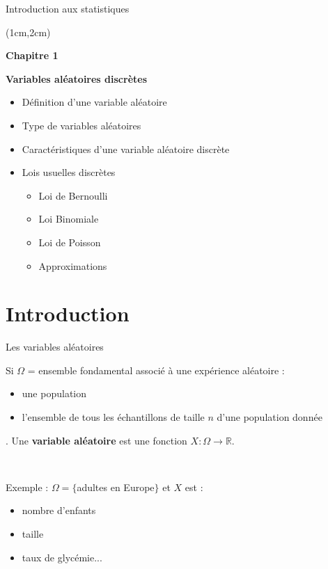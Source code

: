 \documentclass{beamer}
\begin{document}



\begin{frame}{Introduction aux statistiques}
\begin{textblock*}{\textwidth}(1cm,2cm)

\begin{center}{\bf \Large Chapitre 1} \end{center}
\begin{center}{\bf \Large Variables aléatoires discrètes} \end{center}
\vspace{0.3cm}
\begin{itemize}
\item Définition d'une variable aléatoire 
\item Type de variables aléatoires
\item Caractéristiques d'une variable aléatoire discrète
\item Lois usuelles discrètes 
\begin{itemize}
\item Loi de Bernoulli
\item Loi Binomiale
\item Loi de Poisson
\item Approximations
\end{itemize}
\end{itemize}

 \end{textblock*}

\end{frame}

\section{Introduction}
\begin{frame}{Les variables aléatoires}

Si $\Omega $  = ensemble fondamental  associé à une expérience aléatoire :
\begin{itemize}
\item une population 
\item l'ensemble de tous les échantillons de taille $n$ d'une population donnée
\end{itemize}.
Une {\bf variable aléatoire} est une fonction $X:\Omega \longrightarrow \mathbb{R}$.

\

Exemple : $\Omega=\{ $adultes en Europe$\}$ et $X$ est :
\begin{itemize}
\item nombre d'enfants
\item taille
\item taux de glycémie...
\end{itemize} 
\end{frame}
\end{document}
